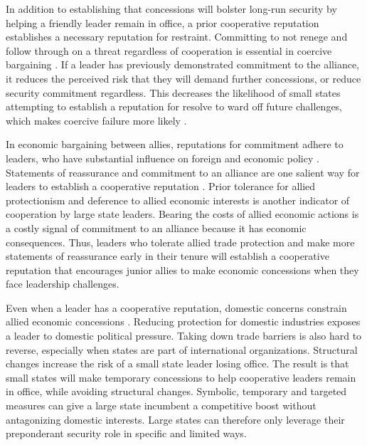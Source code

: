 \documentclass[12pt]{article}
\begin{document}
In addition to establishing that concessions will bolster long-run security by helping a friendly leader remain in office, a prior cooperative reputation establishes a necessary reputation for restraint. 
Committing to not renege and follow through on a threat regardless of cooperation is essential in coercive bargaining \citep{Cebuletal2021}. 
If a leader has previously demonstrated commitment to the alliance, it reduces the perceived risk that they will demand further concessions, or reduce security commitment regardless.
This decreases the likelihood of small states attempting to establish a reputation for resolve to ward off future challenges, which makes coercive failure more likely \citep{Sechser2010, Sechser2018}. 


In economic bargaining between allies, reputations for commitment adhere to leaders, who have substantial influence on foreign and economic policy \citep{Renshonetal2018}.
Statements of reassurance and commitment to an alliance are one salient way for leaders to establish a cooperative reputation \citep{Blankenship2020}.
Prior tolerance for allied protectionism and deference to allied economic interests is another indicator of cooperation by large state leaders.
Bearing the costs of allied economic actions is a costly signal of commitment to an alliance because it has economic consequences. 
Thus, leaders who tolerate allied trade protection and make more statements of reassurance early in their tenure will establish a cooperative reputation that encourages junior allies to make economic concessions when they face leadership challenges.


Even when a leader has a cooperative reputation, domestic concerns constrain allied economic concessions \citep{Davis2008}. 
Reducing protection for domestic industries exposes a leader to domestic political pressure. 
Taking down trade barriers is also hard to reverse, especially when states are part of international organizations.
Structural changes increase the risk of a small state leader losing office.  
The result is that small states will make temporary concessions to help cooperative leaders remain in office, while avoiding structural changes. 
Symbolic, temporary and targeted measures can give a large state incumbent a competitive boost without antagonizing domestic interests. 
Large states can therefore only leverage their preponderant security role in specific and limited ways.
\end{document}
